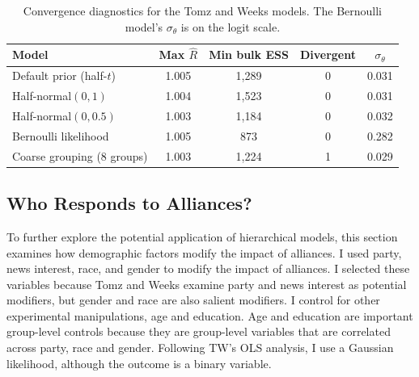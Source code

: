 \documentclass[12pt]{article}
\begin{document}
\begin{table}[htpb]
\begin{center}
\begin{tabular}{lcccc}
\hline
Model & Max $\hat{R}$ & Min bulk ESS & Divergent & $\sigma_\theta$ \\
\hline
Default prior (half-$t$) & 1.005 & 1,289 & 0 & 0.031 \\
Half-normal$(0, 1)$ & 1.004 & 1,523 & 0 & 0.031 \\
Half-normal$(0, 0.5)$ & 1.003 & 1,184 & 0 & 0.032 \\
Bernoulli likelihood & 1.005 & 873 & 0 & 0.282 \\
Coarse grouping (8 groups) & 1.003 & 1,224 & 1 & 0.029 \\
\hline
\end{tabular}
\caption{Convergence diagnostics for the Tomz and Weeks models. The Bernoulli model's $\sigma_\theta$ is on the logit scale.}
\label{tab:tw-diag}
\end{center}
\end{table}

\iffalse
\newpage

\subsection{Who Responds to Alliances?}


To further explore the potential application of hierarchical models, this section examines how demographic factors modify the impact of alliances.
I used party, news interest, race, and gender to modify the impact of alliances.
I selected these variables because Tomz and Weeks examine party and news interest as potential modifiers, but gender \citep{Barnhartetal2020} and race are also salient modifiers.
I control for other experimental manipulations, age and education.
Age and education are important group-level controls because they are group-level variables that are correlated across party, race and gender.
Following TW's OLS analysis, I use a Gaussian likelihood, although the outcome is a binary variable. 
\end{document}
